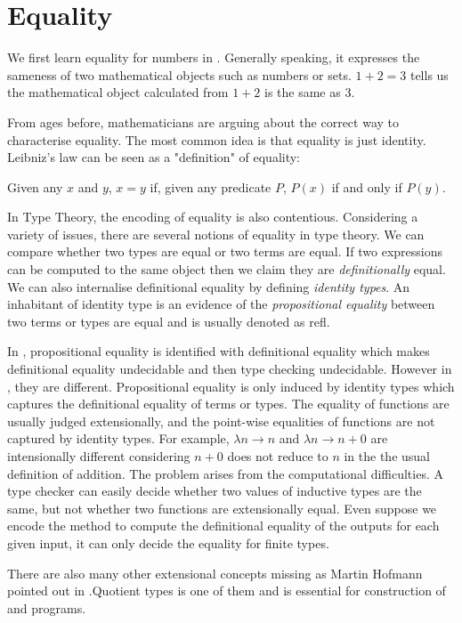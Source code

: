 \section{Equality}

We first learn equality for numbers in \maths. Generally speaking, it
expresses the sameness of two mathematical objects such as numbers or sets.
$1+2=3$ tells us the mathematical object calculated from $1+2$ is the
same as $3$.

From ages before, mathematicians are arguing about the correct way to
characterise equality. The most common idea is that equality is just
identity. Leibniz's law can be seen as a "definition" of
equality:

Given any $x$ and $y$, $x = y$ if, given any predicate $P$, $P(x)$ if and only
if $P(y)$.

In Type Theory, the encoding of equality is also contentious. Considering a variety of issues, there are
several notions of equality in type theory.
We can compare whether two types are equal or two terms are equal. If two
expressions can be computed to the same object then we claim they are
 \emph{definitionally} equal.  
 We can also internalise definitional equality by defining \emph{identity types}. An inhabitant of identity type is an evidence of the \emph{propositional equality} between two terms or types are equal and is usually denoted as refl. 

In \ett, propositional equality is identified with definitional equality which makes definitional equality undecidable and then type checking undecidable. However in \itt, they are different. Propositional equality is only induced by identity types which captures the definitional equality of terms or types. The equality of functions are usually judged extensionally, and the point-wise equalities of functions are not captured by identity types. For example, $\lambda n \to n$ and $\lambda n \to n + 0$ are intensionally different considering $n+0$ does not reduce to $n$ in the the usual definition of addition.
The problem arises from the computational difficulties. A type checker can easily decide whether two
values of inductive types are the same, but not whether two functions
are extensionally equal. Even suppose we encode the method to compute
the definitional equality of the outputs for each given input, it can
only decide the equality for finite types.

There are also many other extensional concepts missing as Martin Hofmann pointed out in \cite{hof:phd}.Quotient types is one of them and is essential for construction of \maths and programs.

